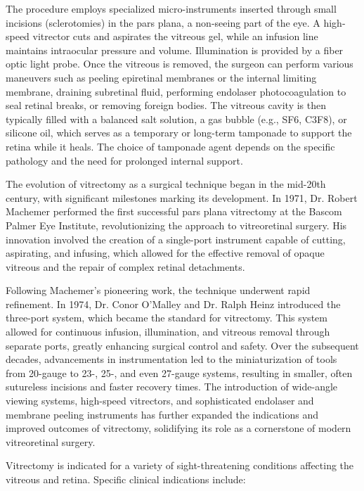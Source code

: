 The procedure employs specialized micro-instruments inserted through small incisions (sclerotomies) in the pars plana, a non-seeing part of the eye. A high-speed vitrector cuts and aspirates the vitreous gel, while an infusion line maintains intraocular pressure and volume. Illumination is provided by a fiber optic light probe. Once the vitreous is removed, the surgeon can perform various maneuvers such as peeling epiretinal membranes or the internal limiting membrane, draining subretinal fluid, performing endolaser photocoagulation to seal retinal breaks, or removing foreign bodies. The vitreous cavity is then typically filled with a balanced salt solution, a gas bubble (e.g., SF6, C3F8), or silicone oil, which serves as a temporary or long-term tamponade to support the retina while it heals. The choice of tamponade agent depends on the specific pathology and the need for prolonged internal support.

The evolution of vitrectomy as a surgical technique began in the mid-20th century, with significant milestones marking its development. In 1971, Dr. Robert Machemer performed the first successful pars plana vitrectomy at the Bascom Palmer Eye Institute, revolutionizing the approach to vitreoretinal surgery. His innovation involved the creation of a single-port instrument capable of cutting, aspirating, and infusing, which allowed for the effective removal of opaque vitreous and the repair of complex retinal detachments.

Following Machemer's pioneering work, the technique underwent rapid refinement. In 1974, Dr. Conor O'Malley and Dr. Ralph Heinz introduced the three-port system, which became the standard for vitrectomy. This system allowed for continuous infusion, illumination, and vitreous removal through separate ports, greatly enhancing surgical control and safety. Over the subsequent decades, advancements in instrumentation led to the miniaturization of tools from 20-gauge to 23-, 25-, and even 27-gauge systems, resulting in smaller, often sutureless incisions and faster recovery times. The introduction of wide-angle viewing systems, high-speed vitrectors, and sophisticated endolaser and membrane peeling instruments has further expanded the indications and improved outcomes of vitrectomy, solidifying its role as a cornerstone of modern vitreoretinal surgery.

Vitrectomy is indicated for a variety of sight-threatening conditions affecting the vitreous and retina. Specific clinical indications include:

